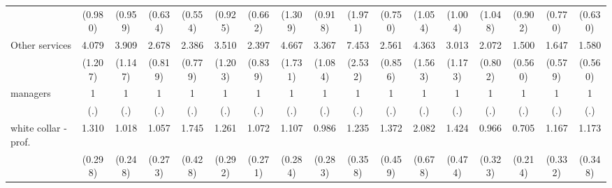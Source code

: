 {\begin{tabular}{l*{16}{c}}
                    &     (0.980)         &     (0.959)         &     (0.634)         &     (0.554)         &     (0.925)         &     (0.662)         &     (1.309)         &     (0.918)         &     (1.971)         &     (0.750)         &     (1.054)         &     (1.004)         &     (1.048)         &     (0.902)         &     (0.770)         &     (0.630)         \\
[1em]
Other services      &       4.079\sym{***}&       3.909\sym{***}&       2.678\sym{**} &       2.386\sym{**} &       3.510\sym{***}&       2.397\sym{*}  &       4.667\sym{***}&       3.367\sym{***}&       7.453\sym{***}&       2.561\sym{**} &       4.363\sym{***}&       3.013\sym{**} &       2.072         &       1.500         &       1.647         &       1.580         \\
                    &     (1.207)         &     (1.147)         &     (0.819)         &     (0.779)         &     (1.203)         &     (0.839)         &     (1.731)         &     (1.084)         &     (2.532)         &     (0.856)         &     (1.563)         &     (1.173)         &     (0.802)         &     (0.560)         &     (0.579)         &     (0.560)         \\
[1em]
managers            &           1         &           1         &           1         &           1         &           1         &           1         &           1         &           1         &           1         &           1         &           1         &           1         &           1         &           1         &           1         &           1         \\
                    &         (.)         &         (.)         &         (.)         &         (.)         &         (.)         &         (.)         &         (.)         &         (.)         &         (.)         &         (.)         &         (.)         &         (.)         &         (.)         &         (.)         &         (.)         &         (.)         \\
[1em]
white collar - prof.&       1.310         &       1.018         &       1.057         &       1.745\sym{*}  &       1.261         &       1.072         &       1.107         &       0.986         &       1.235         &       1.372         &       2.082\sym{*}  &       1.424         &       0.966         &       0.705         &       1.167         &       1.173         \\
                    &     (0.298)         &     (0.248)         &     (0.273)         &     (0.428)         &     (0.292)         &     (0.271)         &     (0.284)         &     (0.283)         &     (0.358)         &     (0.459)         &     (0.678)         &     (0.474)         &     (0.323)         &     (0.214)         &     (0.332)         &     (0.348)         \\

\end{tabular}}

